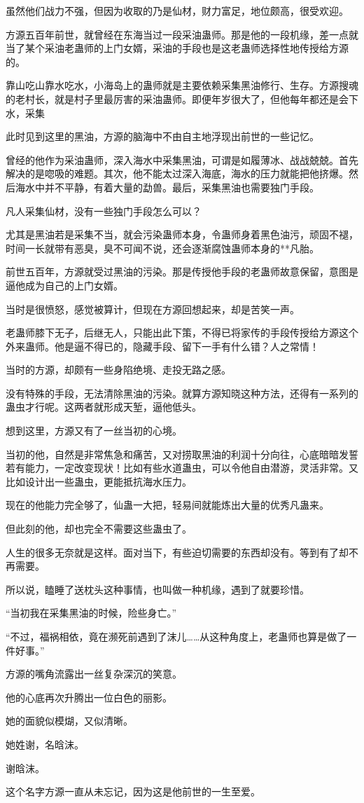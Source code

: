 \begin{this_body}
虽然他们战力不强，但因为收取的乃是仙材，财力富足，地位颇高，很受欢迎。

方源五百年前世，就曾经在东海当过一段采油蛊师。那是他的一段机缘，差一点就当了某个采油老蛊师的上门女婿，采油的手段也是这老蛊师选择性地传授给方源的。

靠山吃山靠水吃水，小海岛上的蛊师就是主要依赖采集黑油修行、生存。方源搜魂的老村长，就是村子里最厉害的采油蛊师。即便年岁很大了，但他每年都还是会下水，采集

此时见到这里的黑油，方源的脑海中不由自主地浮现出前世的一些记忆。

曾经的他作为采油蛊师，深入海水中采集黑油，可谓是如履薄冰、战战兢兢。首先解决的是唿吸的难题。其次，他不能太过深入海底，海水的压力就能把他挤爆。然后海水中并不平静，有着大量的勐兽。最后，采集黑油也需要独门手段。

凡人采集仙材，没有一些独门手段怎么可以？

尤其是黑油若是采集不当，就会污染蛊师本身，令蛊师身着黑色油污，顽固不褪，时间一长就带有恶臭，臭不可闻不说，还会逐渐腐蚀蛊师本身的**凡胎。

前世五百年，方源就受过黑油的污染。那是传授他手段的老蛊师故意保留，意图是逼他成为自己的上门女婿。

当时是很愤怒，感觉被算计，但现在方源回想起来，却是苦笑一声。

老蛊师膝下无子，后继无人，只能出此下策，不得已将家传的手段传授给方源这个外来蛊师。他是逼不得已的，隐藏手段、留下一手有什么错？人之常情！

当时的方源，却颇有一些身陷绝境、走投无路之感。

没有特殊的手段，无法清除黑油的污染。就算方源知晓这种方法，还得有一系列的蛊虫才行呢。这两者就形成天堑，逼他低头。

想到这里，方源又有了一丝当初的心境。

当初的他，自然是非常焦急和痛苦，又对捞取黑油的利润十分向往，心底暗暗发誓若有能力，一定改变现状！比如有些水道蛊虫，可以令他自由潜游，灵活非常。又比如设计出一些蛊虫，更能抵抗海水压力。

现在的他能力完全够了，仙蛊一大把，轻易间就能炼出大量的优秀凡蛊来。

但此刻的他，却也完全不需要这些蛊虫了。

人生的很多无奈就是这样。面对当下，有些迫切需要的东西却没有。等到有了却不再需要。

所以说，瞌睡了送枕头这种事情，也叫做一种机缘，遇到了就要珍惜。

“当初我在采集黑油的时候，险些身亡。”

“不过，福祸相依，竟在濒死前遇到了沫儿……从这种角度上，老蛊师也算是做了一件好事。”

方源的嘴角流露出一丝复杂深沉的笑意。

他的心底再次升腾出一位白色的丽影。

她的面貌似模煳，又似清晰。

她姓谢，名晗沫。

谢晗沫。

这个名字方源一直从未忘记，因为这是他前世的一生至爱。

\end{this_body}

